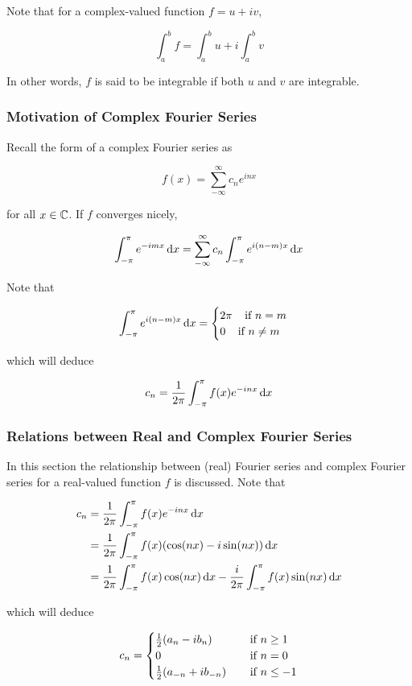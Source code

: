 \documentclass[a4paper,12pt]{article}
\begin{document}
Note that for a complex-valued function $f=u+iv$,

$$\int_{a}^{b}f=\int_{a}^{b}u+i\int_{a}^{b}v$$\s

In other words, $f$ is said to be integrable if both $u$ and $v$ are integrable.

\subsubsection{Motivation of Complex Fourier Series}
Recall the form of a complex Fourier series as

$$f(x)=\sum_{-\infty}^{\infty}c_{n}e^{inx}$$\s

for all $x\in\mathbb{C}$. If $f$ converges nicely,

$$\int_{-\pi}^{\pi}e^{-imx}\,\mathrm{d} x=\sum_{-\infty}^{\infty}c_{n}\int_{-\pi}^{\pi}e^{i(n-m)x}\,\mathrm{d} x$$\s

Note that

$$\int_{-\pi}^{\pi}e^{i(n-m)x}\,\mathrm{d} x=\begin{cases}
  2\pi\;\;\;\;\text{if }n=m\\
  0\;\;\;\;\text{if }n\neq m
\end{cases}$$\s

which will deduce

$$c_{n}=\frac{1}{2\pi}\int_{-\pi}^{\pi}f(x)e^{-inx}\,\mathrm{d} x$$

\subsubsection{Relations between Real and Complex Fourier Series}
In this section the relationship between (real) Fourier series and complex Fourier series for a real-valued function $f$ is discussed. Note that

$$\begin{aligned}[t]
  c_{n}&=\frac{1}{2\pi}\int_{-\pi}^{\pi}f(x)e^{-inx}\,\mathrm{d} x\\
  &=\frac{1}{2\pi}\int_{-\pi}^{\pi}f(x)(\cos(nx)-i\sin(nx))\,\mathrm{d} x\\
  &=\frac{1}{2\pi}\int_{-\pi}^{\pi}f(x)\cos(nx)\,\mathrm{d} x-\frac{i}{2\pi}\int_{-\pi}^{\pi}f(x)\sin(nx)\,\mathrm{d} x
\end{aligned}$$\s

which will deduce

$$c_{n}=\begin{cases}
  \frac{1}{2}(a_{n}-ib_{n})&\;\;\;\;\text{if }n\geq 1\\
  0&\;\;\;\;\text{if }n=0\\
  \frac{1}{2}(a_{-n}+ib_{-n})&\;\;\;\;\text{if }n\leq -1
\end{cases}$$\s
\end{document}
